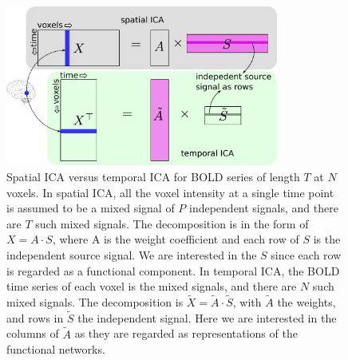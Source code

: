 \begin{figure}[ptb]
  \centering
  \includegraphics[width=0.8\textwidth]{figures/c2/ica}
  \caption{Spatial ICA versus temporal ICA for BOLD series of length $T$ at $N$
    voxels.  In spatial ICA, all the voxel intensity at a single time point is
    assumed to be a mixed signal of $P$ independent signals, and there are $T$ such
    mixed signals. The decomposition is in the form of $X = A\cdot S$, where A
    is the weight coefficient and each row of $S$ is the independent source
    signal.  We are interested in the $S$ since each row is regarded as a
    functional component. In temporal ICA, the BOLD time series of each voxel is
    the mixed signals, and there are $N$ such mixed signals. The decomposition
    is $\tilde X = \tilde A \cdot \tilde S$, with $\tilde A$ the weights, and
    rows in $\tilde S$ the independent signal. Here we are interested in the
    columns of $\tilde A$ as they are regarded as representations of the
    functional networks.  }
  \label{fig:c2ica}
\end{figure}

